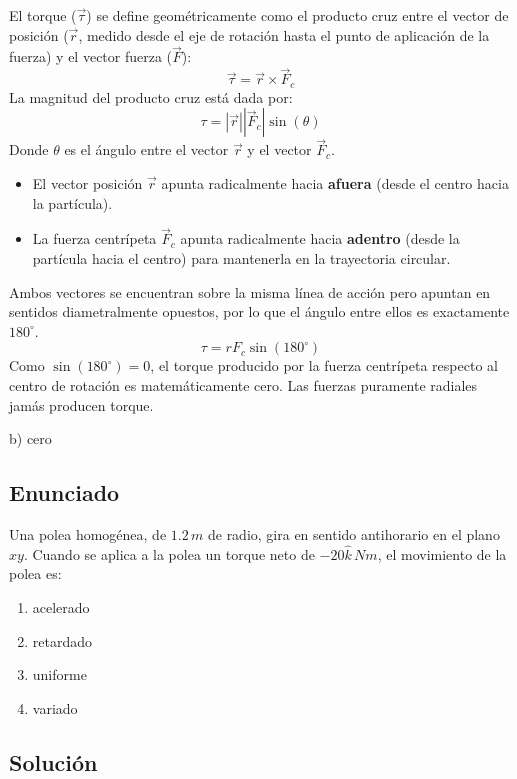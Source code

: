 \documentclass[12pt, a4paper]{article}
\begin{document}
El torque ($\vec{\tau}$) se define geométricamente como el producto cruz entre el vector de posición ($\vec{r}$, medido desde el eje de rotación hasta el punto de aplicación de la fuerza) y el vector fuerza ($\vec{F}$):
$$ \vec{\tau} = \vec{r} \times \vec{F}_c $$
La magnitud del producto cruz está dada por:
$$ \tau = |\vec{r}| |\vec{F}_c| \sin(\theta) $$
Donde $\theta$ es el ángulo entre el vector $\vec{r}$ y el vector $\vec{F}_c$.

\begin{itemize}
    \item El vector posición $\vec{r}$ apunta radicalmente hacia \textbf{afuera} (desde el centro hacia la partícula).
    \item La fuerza centrípeta $\vec{F}_c$ apunta radicalmente hacia \textbf{adentro} (desde la partícula hacia el centro) para mantenerla en la trayectoria circular.
\end{itemize}

Ambos vectores se encuentran sobre la misma línea de acción pero apuntan en sentidos diametralmente opuestos, por lo que el ángulo entre ellos es exactamente $180^\circ$.
$$ \tau = r F_c \sin(180^\circ) $$
Como $\sin(180^\circ) = 0$, el torque producido por la fuerza centrípeta respecto al centro de rotación es matemáticamente cero. Las fuerzas puramente radiales jamás producen torque.

\begin{tcolorbox}[colback=green!5!white, colframe=green!50!black, title=Respuesta Final]
\centering \Large b) cero
\end{tcolorbox}

\newpage

\subsection*{Enunciado}
Una polea homogénea, de $1.2\,\si{m}$ de radio, gira en sentido antihorario en el plano $xy$. Cuando se aplica a la polea un torque neto de $-20\hat{k}\,\si{Nm}$, el movimiento de la polea es:
\begin{enumerate}[label=\alph*)]
    \item acelerado
    \item retardado
    \item uniforme
    \item variado
\end{enumerate}

\subsection*{Solución}
\end{document}
